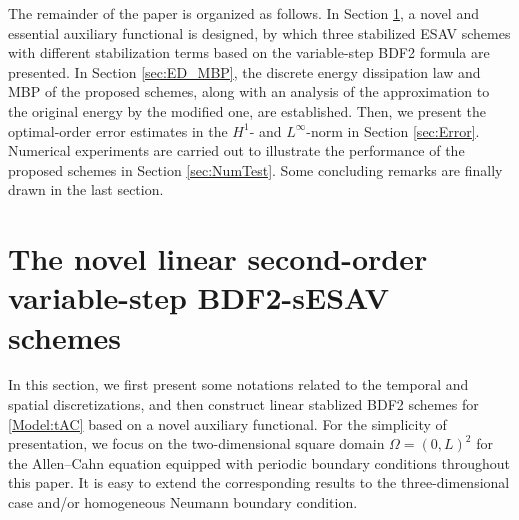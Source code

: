 \documentclass{m2an}
\begin{document}
The remainder of the paper is organized as follows. 
In Section \ref{sec:Scheme}, a novel and essential auxiliary functional is designed, by which three stabilized ESAV schemes with different stabilization terms based on the variable-step BDF2 formula are presented.  In Section \ref{sec:ED_MBP}, the discrete energy dissipation law and MBP of the proposed schemes, along with an analysis of the approximation to the original energy by the modified one, are established. Then, we present the optimal-order error estimates in the $H^{1}$- and $ L^{\infty} $-norm in Section \ref{sec:Error}. Numerical experiments are carried out to illustrate the performance of the proposed schemes in Section \ref{sec:NumTest}. Some concluding remarks are finally drawn in the last section. 
\section{The novel linear second-order variable-step BDF2-sESAV schemes}\label{sec:Scheme}
In this section, we first present some notations related to the temporal and spatial discretizations, %
and then construct linear stablized BDF2 schemes for \eqref{Model:tAC} based on a novel auxiliary functional. For the simplicity of presentation, we focus on the two-dimensional square domain $ \Omega=(0,L)^2$ for the Allen--Cahn equation equipped with periodic boundary conditions throughout this paper. It is easy to extend the corresponding results to the three-dimensional case and/or homogeneous Neumann boundary condition.
\end{document}
